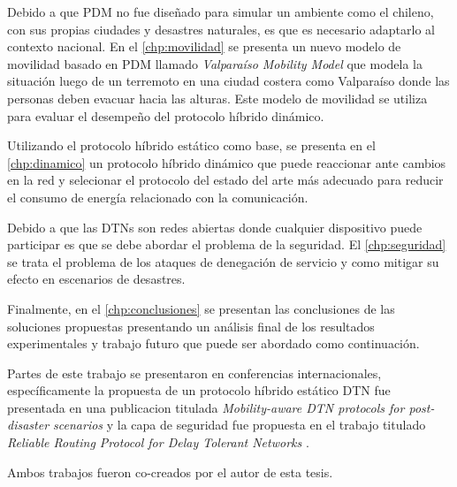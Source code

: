 Debido a que PDM no fue diseñado para simular un ambiente como el chileno, con
sus propias ciudades y desastres naturales, es que es necesario adaptarlo al
contexto nacional. En el \ref{chp:movilidad} se presenta un nuevo modelo de
movilidad basado en PDM llamado \textit{Valparaíso Mobility Model} que modela la
situación luego de un terremoto en una ciudad costera como Valparaíso donde las
personas deben evacuar hacia las alturas. Este modelo de movilidad se utiliza
para evaluar el desempeño del protocolo híbrido dinámico.

Utilizando el protocolo híbrido estático como base, se presenta en el
\ref{chp:dinamico} un protocolo híbrido dinámico que puede reaccionar ante
cambios en la red y selecionar el protocolo del estado del arte más adecuado
para reducir el consumo de energía relacionado con la comunicación.

Debido a que las DTNs son redes abiertas donde cualquier dispositivo puede
participar es que se debe abordar el problema de la seguridad. El
\ref{chp:seguridad} se trata el problema de los ataques de denegación de
servicio y como mitigar su efecto en escenarios de desastres.

Finalmente, en el \ref{chp:conclusiones} se presentan las conclusiones de las
soluciones propuestas presentando un análisis final de los resultados
experimentales y trabajo futuro que puede ser abordado como continuación.






Partes de este trabajo se presentaron en conferencias internacionales,
específicamente la propuesta de un protocolo híbrido estático DTN fue presentada
en una publicacion titulada \textit{Mobility-aware DTN protocols for
post-disaster scenarios} \cite{paper_evaluacion_nosotros} y la capa de seguridad
fue propuesta en el trabajo titulado \textit{Reliable Routing Protocol for Delay
Tolerant Networks} \cite{DBLP:conf/icpads/GarayRH15}.

Ambos trabajos fueron co-creados por el autor de esta tesis.
